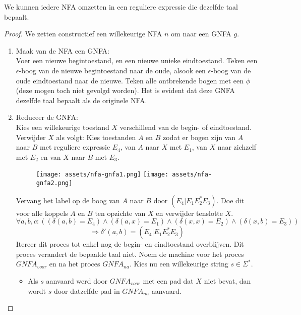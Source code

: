 \documentclass[main.tex]{subfiles}
\begin{document}
\begin{st}
  \label{st:nfa-naar-regex}
  We kunnen iedere NFA omzetten in een reguliere expressie die dezelfde taal bepaalt.
  
  \begin{proof}
    We zetten constructief een willekeurige NFA $n$ om naar een GNFA $g$.
    \begin{enumerate}
    \item Maak van de NFA een GNFA:\\
      Voer een nieuwe begintoestand, en een nieuwe unieke eindtoestand.
      Teken een $\epsilon$-boog van de nieuwe begintoestand naar de oude, alsook een $\epsilon$-boog van de oude eindtoestand naar de nieuwe.
      Teken alle ontbrekende bogen met een $\phi$ (deze mogen toch niet gevolgd worden).
      Het is evident dat deze GNFA dezelfde taal bepaalt als de originele NFA.
    \item Reduceer de GNFA:\\
      Kies een willekeurige toestand $X$ verschillend van de begin- of eindtoestand.
      Verwijder $X$ als volgt: Kies toestanden $A$ en $B$ zodat er bogen zijn van $A$ naar $B$ met reguliere expressie $E_{4}$, van $A$ naar $X$ met $E_{1}$, van $X$ naar zichzelf met $E_{2}$ en van $X$ naar $B$ met $E_{3}$.
      \begin{figure}[H]
        \centering
        \texttt{[image: assets/nfa-gnfa1.png]}
        \texttt{[image: assets/nfa-gnfa2.png]}   
        \label{fig:nfa-gnfa}
      \end{figure}
      Vervang het label op de boog van $A$ naar $B$ door $(E_{4}|E_{1}E_{2}^{*}E_{3})$.
      Doe dit voor alle koppels $A$ en $B$ ten opzichte van $X$ en verwijder tenslotte $X$.
      \[
      \forall a,b,c: ((\delta(a,b)=E_{4})\wedge (\delta(a,x)=E_{1})\wedge (\delta(x,x)=E_{2})\wedge (\delta(x,b)=E_{3})) 
      \]
      \[
      \Rightarrow \delta'(a,b)=(E_{4}|E_{1}E_{2}^{*}E_{3})
      \]
      Itereer dit proces tot enkel nog de begin- en eindtoestand overblijven.
      Dit proces verandert de bepaalde taal niet.
      Noem de machine voor het proces $GNFA_{voor}$ en na het proces $GNFA_{na}$.
      Kies nu een willekeurige string $s \in \Sigma^{*}$.
      \begin{itemize}
      \item
        Als $s$ aanvaard werd door $GNFA_{voor}$ met een pad dat $X$ niet bevat, dan wordt $s$ door datzelfde pad in $GNFA_{na}$ aanvaard.

\end{itemize}
\end{enumerate}
\end{proof}
\end{st}
\end{document}
